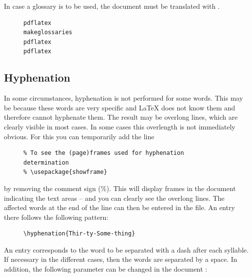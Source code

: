 In case a glossary is to be used, the document must be translated with
.

\begin{figure}[H]
    \small
    \centering
    \begin{BVerbatim}
pdflatex
makeglossaries
pdflatex
pdflatex
    \end{BVerbatim}
\end{figure}

\subsection{Hyphenation}

In some circumstances, hyphenation is not performed for some words. This may
be because these words are very specific and \LaTeX{} does not know them and
therefore cannot hyphenate them. The result may be overlong lines, which are
clearly visible in most cases. In some cases this overlength is not
immediately obvious. For this you can temporarily add the line

\begin{figure}[H]
    \small
    \centering
    \begin{BVerbatim}
% To see the (page)frames used for hyphenation determination
% \usepackage{showframe}
    \end{BVerbatim}
\end{figure}

by removing the comment sign (\%). This will display frames in the document
indicating the text areas -- and you can clearly see the overlong lines. The
affected words at the end of the line can then be entered in the
 file. An entry there follows the
following pattern:

\begin{figure}[H]
    \small
    \centering
    \begin{BVerbatim}
\hyphenation{Thir-ty-Some-thing}
    \end{BVerbatim}
\end{figure}

An entry corresponds to the word to be separated with a dash after each
syllable. If necessary in the different cases, then the words are separated
by a space. In addition, the following parameter can be changed in the document
:

